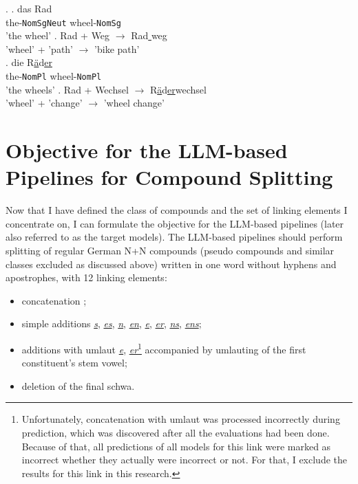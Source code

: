 \documentclass[11pt]{article}
\begin{document}
\ex. \label{ex12}
\ag. das Rad \\
the-\texttt{NomSgNeut} wheel-\texttt{NomSg} \\
{'the wheel'}
\bg. Rad + Weg {$\rightarrow$} Rad\underline{ }weg \\
'wheel' + 'path' {$\rightarrow$} {'bike path'} \\
\cg. die R\underline{{\"a}}d\underline{er} \\
the-\texttt{NomPl} wheel-\texttt{NomPl} \\
{'the wheels'}
\dg. Rad + Wechsel {$\rightarrow$} R\underline{{\"a}}d\underline{er}wechsel \\
'wheel' + 'change' {$\rightarrow$} {'wheel change'} \\


\section{Objective for the LLM-based Pipelines for Compound Splitting}
\label{sec:objective}

Now that I have defined the class of compounds and the set of linking elements I concentrate on, I can formulate the objective for the LLM-based pipelines (later also referred to as the target models). The LLM-based pipelines should perform splitting of regular German N+N compounds (pseudo compounds and similar classes excluded as discussed above) written in one word without hyphens and apostrophes, with 12 linking elements:

\begin{itemize}

    \item concatenation \textit{\underline{ }};
    
    \item simple additions \textit{\underline{s}}, \textit{\underline{es}}, \textit{\underline{n}}, \textit{\underline{en}}, \textit{\underline{e}}, \textit{\underline{er}}, \textit{\underline{ns}}, \textit{\underline{ens}};
    
    \item additions with umlaut \textit{\underline{e}}, \textit{\underline{er}}\footnote{Unfortunately, concatenation with umlaut was processed incorrectly during prediction, which was discovered after all the evaluations had been done. Because of that, all predictions of all models for this link were marked as incorrect whether they actually were incorrect or not. For that, I exclude the results for this link in this research.} accompanied by umlauting of the first constituent's stem vowel;
    
    \item deletion of the final schwa.
    
\end{itemize}
\end{document}
